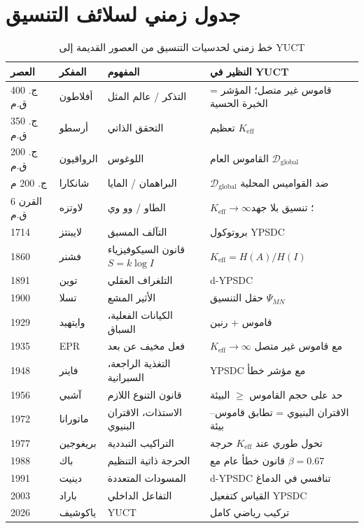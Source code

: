 \documentclass[12pt,a4paper]{article}
\begin{document}
	\section{جدول زمني لسلائف التنسيق}
	
	\begin{table}[htbp]
		\centering
		\caption{خط زمني لحدسيات التنسيق من العصور القديمة إلى YUCT}
		\label{tab:timeline}
		\small
		\begin{tabular}{p{1.2cm}p{3cm}p{4.5cm}p{4cm}}
			\toprule
			\textbf{العصر} & \textbf{المفكر} & \textbf{المفهوم} & \textbf{النظير في YUCT} \\
			\midrule
			ج. 400 ق.م & أفلاطون & التذكر / عالم المثل & قاموس غير متصل؛ المؤشر = الخبرة الحسية \\
			ج. 350 ق.م & أرسطو & التحقق الذاتي & تعظيم \(K_{\mathrm{eff}}\) \\
			ج. 200 ق.م & الرواقيون & اللوغوس & القاموس العام \(\mathcal{D}_{\text{global}}\) \\
			ج. 200 م & شانكارا & البراهمان / المايا & \(\mathcal{D}_{\text{global}}\) ضد القواميس المحلية \\
			القرن 6 ق.م & لاوتزه & الطاو / وو وي & \(K_{\mathrm{eff}} \to \infty\)؛ تنسيق بلا جهد \\
			1714 & لايبنتز & التآلف المسبق & بروتوكول YPSDC \\
			1860 & فشنر & قانون السيكوفيزياء \(S = k \log I\) & \(K_{\mathrm{eff}} = H(A)/H(I)\) \\
			1891 & توين & التلغراف العقلي & d-YPSDC \\
			1900 & تسلا & الأثير المشع & حقل التنسيق \(\Psi_{MN}\) \\
			1929 & وايتهيد & الكيانات الفعلية، السباق & قاموس + رنين \\
			1935 & EPR & فعل مخيف عن بعد & \(K_{\mathrm{eff}} \to \infty\) مع قاموس غير متصل \\
			1948 & فاينر & التغذية الراجعة، السبرانية & YPSDC مع مؤشر خطأ \\
			1956 & آشبي & قانون التنوع اللازم & حد على حجم القاموس \(\ge\) البيئة \\
			1972 & ماتورانا & الاستذات، الاقتران البنيوي & الاقتران البنيوي = تطابق قاموس–بيئة \\
			1977 & بريغوجين & التراكيب التبددية & تحول طوري عند \(K_{\mathrm{eff}}\) حرجة \\
			1988 & باك & الحرجة ذاتية التنظيم & قانون خطأ عام مع \(\beta = 0.67\) \\
			1991 & دينيت & المسودات المتعددة & d-YPSDC تنافسي في الدماغ \\
			2003 & باراد & التفاعل الداخلي & القياس كتفعيل YPSDC \\
			2026 & ياكوشيف & YUCT & تركيب رياضي كامل \\
			\bottomrule
		\end{tabular}
	\end{table}
	
\end{document}

